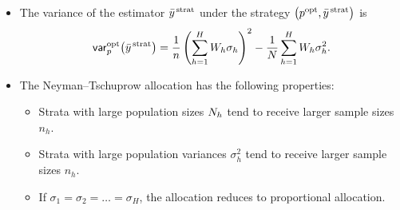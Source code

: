 \documentclass{my_eth_beamer}
\numberwithin{equation}{section}
\begin{document}
\begin{frame}
    \begin{itemize}
    \setlength{\itemsep}{14pt}
        \item The \alert{variance} of the estimator $\bar{y}^{\,\mathrm{strat}}$ under
            the strategy $\big(p^{\mathrm{opt}}, \bar{y}^{\,\mathrm{strat}}\big)$ is
            \begin{equation*}
                \mathsf{var}_p^{\mathrm{opt}}\big(\bar{y}^{\,\mathrm{strat}}\big) =
                    \frac{1}{n}\left(\sum_{h = 1}^H W_h \sigma_h\right)^2 -
                    \frac{1}{N}\sum_{h = 1}^H W_h \sigma_{h}^2.
            \end{equation*}

        \vspace{0.25em}

        \item The Neyman--Tschuprow allocation has the following
            \alert{properties}:
            \vspace{0.25em}
            \begin{itemize}
            \setlength{\itemsep}{8pt}
                \item Strata with \alert{large population sizes} $N_{h}$ tend to
                    receive \alert{larger} sample sizes $n_h$.
                \item Strata with \alert{large population variances}
                    $\sigma_h^2$ tend to receive \alert{larger} sample sizes
                    $n_h$.
                \item If $\sigma_{1} = \sigma_{2} = \ldots = \sigma_{H}$, the
                    allocation reduces to proportional allocation.
            \end{itemize}
    \end{itemize}
\end{frame}
\end{document}
